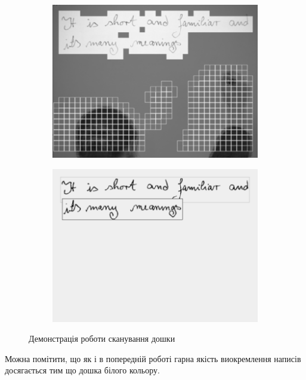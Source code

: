 \begin{figure}[H]
  \centering
  \begin{subfigure}[b]{0.35\textwidth}
    \centering
    \includegraphics[width=\textwidth]{images/wienecke_1}
  \end{subfigure}
  \begin{subfigure}[b]{0.35\textwidth}
    \centering
    \includegraphics[width=\textwidth]{images/wienecke_2}
  \end{subfigure}
  \caption{Демонстрація роботи сканування дошки \cite{wienecke}
    \label{fig:wienecke}
  }
\end{figure}

Можна помітити, що як і в попередній роботі гарна якість виокремлення написів
досягається тим що дошка білого кольору.


